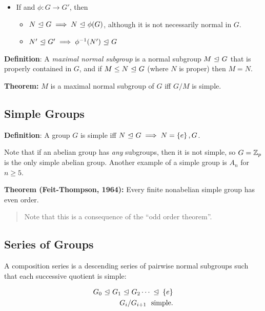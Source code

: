 \begin{itemize}
\tightlist
\item
  If and \(\phi: G\to G'\), then

  \begin{itemize}
  \tightlist
  \item
    \(N {~\trianglelefteq~} G \implies N {~\trianglelefteq~} \phi(G)\), although it is not
    necessarily normal in \(G\).
  \item
    \(N' {~\trianglelefteq~} G' \implies \phi^{-1}(N') {~\trianglelefteq~} G\)
  \end{itemize}
\end{itemize}

\textbf{Definition}: A \emph{maximal normal subgroup} is a normal
subgroup \(M {~\trianglelefteq~} G\) that is properly contained in \(G\), and if
\(M \leq N {~\trianglelefteq~} G\) (where \(N\) is proper) then \(M = N\).

\textbf{Theorem:} \(M\) is a maximal normal subgroup of \(G\) iff
\(G/M\) is simple.

\hypertarget{simple-groups}{%
\subsection{Simple Groups}\label{simple-groups}}

\textbf{Definition}: A group \(G\) is simple iff
\(N {~\trianglelefteq~} G \implies N = \left\{{e}\right\}, G\).

Note that if an abelian group has \emph{any} subgroups, then it is not
simple, so \(G = {\mathbb{Z}}_p\) is the only simple abelian group. Another
example of a simple group is \(A_n\) for \(n\geq 5\).

\textbf{Theorem (Feit-Thompson, 1964):} Every finite nonabelian simple
group has even order.

\begin{quote}
Note that this is a consequence of the ``odd order theorem''.
\end{quote}

\hypertarget{series-of-groups}{%
\subsection{Series of Groups}\label{series-of-groups}}

A composition series is a descending series of pairwise normal subgroups
such that each successive quotient is simple:

\begin{align*}
G_0 {~\trianglelefteq~} G_1 {~\trianglelefteq~} G_2 \cdots {~\trianglelefteq~} \left\{{e}\right\} \\
G_i/G_{i+1}~\text{ simple}
.\end{align*}

